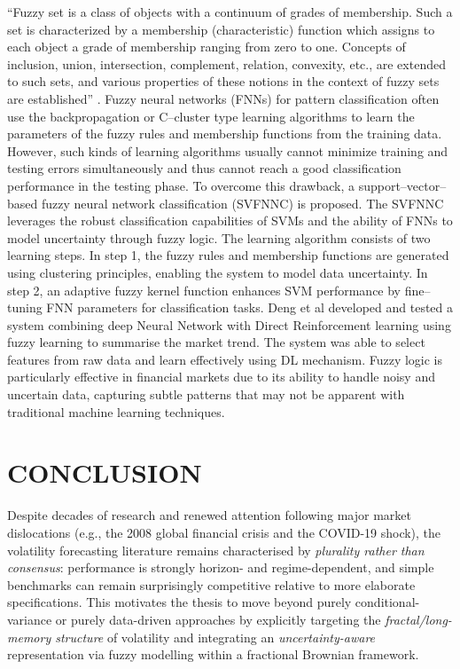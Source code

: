 \documentclass[12pt,a4paper]{report}
\numberwithin{equation}{section}
\begin{document}
``Fuzzy set is a class of objects with a continuum of grades of
membership. Such a set is characterized by a membership (characteristic)
function which assigns to each object a grade of membership ranging from
zero to one. Concepts of inclusion, union, intersection, complement,
relation, convexity, etc., are extended to such sets, and various
properties of these notions in the context of fuzzy sets are
established'' \cite{zadeh1965fuzzy_66}. Fuzzy neural networks (FNNs) for pattern
classification often use the backpropagation or C--cluster type learning
algorithms to learn the parameters of the fuzzy rules and membership
functions from the training data. However, such kinds of learning
algorithms usually cannot minimize training and testing errors
simultaneously and thus cannot reach a good classification performance
in the testing phase. To overcome this drawback, a support--vector--based
fuzzy neural network classification (SVFNNC) is proposed. The SVFNNC
leverages the robust classification capabilities of SVMs and the ability
of FNNs to model uncertainty through fuzzy logic. The learning algorithm
consists of two learning steps. In step 1, the fuzzy rules and
membership functions are generated using clustering principles, enabling
the system to model data uncertainty. In step 2, an adaptive fuzzy
kernel function enhances SVM performance by fine--tuning FNN parameters
for classification tasks. Deng et al \cite{deng2017deep_67} developed and tested a
system combining deep Neural Network with Direct Reinforcement learning
using fuzzy learning to summarise the market trend. The system was able
to select features from raw data and learn effectively using DL
mechanism. Fuzzy logic is particularly effective in financial markets
due to its ability to handle noisy and uncertain data, capturing subtle
patterns that may not be apparent with traditional machine learning
techniques.

\hypertarget{literature-review-conclusion}{%
\section{\texorpdfstring{\textbf{CONCLUSION}}{CONCLUSION}}\label{literature-review-conclusion}}

Despite decades of research and renewed attention following major market dislocations (e.g., the 2008 global financial crisis and the COVID-19 shock), the volatility forecasting literature remains characterised by \emph{plurality rather than consensus}: performance is strongly horizon- and regime-dependent, and simple benchmarks can remain surprisingly competitive relative to more elaborate specifications. This motivates the thesis to move beyond purely conditional-variance or purely data-driven approaches by explicitly targeting the \emph{fractal/long-memory structure} of volatility and integrating an \emph{uncertainty-aware} representation via fuzzy modelling within a fractional Brownian framework.
\end{document}
